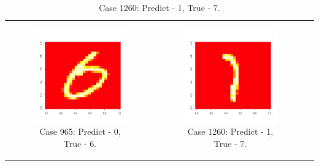 \documentclass[10pt]{extarticle}
\begin{document}
\begin{table}{}
\begin{tabular}{c c c}
\begin{subfigure}{0.3\textwidth}\centering\includegraphics[scale = .25]{../Images/965.png}\caption{Case 965: Predict - 0, True - 6.}\label{fig:taba}\end{subfigure}&
\begin{subfigure}{0.3\textwidth}\centering\includegraphics[scale = .25]{../Images/1260.png}\caption{Case 1260: Predict - 1, True - 7.}\label{fig:taba}\end{subfigure}\end{tabular}
\end{table}
\end{document}
